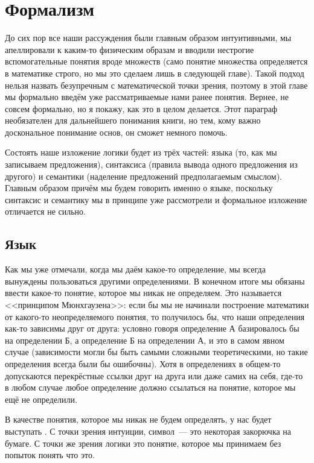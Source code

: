 \section{Формализм}

До сих пор все наши рассуждения были главным образом интуитивными, мы апеллировали к каким-то физическим образам и вводили нестрогие вспомогательные понятия вроде множеств (само понятие множества определяется в математике строго, но мы это сделаем лишь в следующей главе). Такой подход нельзя назвать безупречным с математической точки зрения, поэтому в этой главе мы формально введём уже рассматриваемые нами ранее понятия.  Вернее, не совсем формально, но я покажу, как это в целом делается. Этот параграф необязателен для дальнейшего понимания книги, но тем, кому важно доскональное понимание основ, он сможет немного помочь.

Состоять наше изложение логики будет из трёх частей: языка (то, как мы записываем предложения), синтаксиса (правила вывода одного предложения из другого) и семантики (наделение предложений предполагаемым смыслом). Главным образом причём мы будем говорить именно о языке, поскольку синтаксис и семантику мы в принципе уже рассмотрели и формальное изложение отличается не сильно.

\subsection{Язык}

Как мы уже отмечали, когда мы даём какое-то определение, мы всегда вынуждены пользоваться другими определениями. В конечном итоге мы обязаны ввести какое-то понятие, которое мы никак не определяем. Это называется <<принципом Мюнхгаузена>>: если бы мы не начинали построение математики от какого-то неопределяемого понятия, то получилось бы, что наши определения как-то зависимы друг от друга: условно говоря определение А базировалось бы на определении Б, а определение Б на определении А, и это в самом явном случае (зависимости могли бы быть самыми сложными теоретическими, но такие определения всегда были бы ошибочны). Хотя в определениях в общем-то допускаются перекрёстные ссылки друг на друга или даже самих на себя, где-то в любом случае любое определение должно ссылаться на понятие, которое мы ещё не определили.

В качестве понятия, которое мы никак не будем определять, у нас будет выступать . С точки зрения интуиции, символ~--- это некоторая закорючка на бумаге. С точки же зрения логики это понятие, которое мы принимаем без попыток понять что это.

